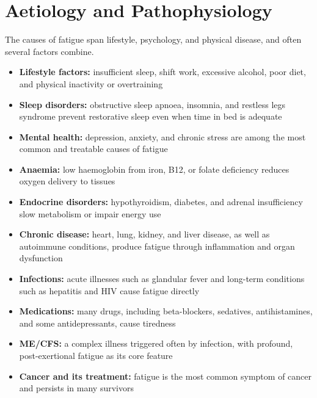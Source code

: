 \section*{Aetiology and Pathophysiology}
The causes of fatigue span lifestyle, psychology, and physical disease, and often several factors combine.
\begin{itemize}
    \item \textbf{Lifestyle factors:} insufficient sleep, shift work, excessive alcohol, poor diet, and physical inactivity or overtraining
    \item \textbf{Sleep disorders:} obstructive sleep apnoea, insomnia, and restless legs syndrome prevent restorative sleep even when time in bed is adequate
    \item \textbf{Mental health:} depression, anxiety, and chronic stress are among the most common and treatable causes of fatigue
    \item \textbf{Anaemia:} low haemoglobin from iron, B12, or folate deficiency reduces oxygen delivery to tissues
    \item \textbf{Endocrine disorders:} hypothyroidism, diabetes, and adrenal insufficiency slow metabolism or impair energy use
    \item \textbf{Chronic disease:} heart, lung, kidney, and liver disease, as well as autoimmune conditions, produce fatigue through inflammation and organ dysfunction
    \item \textbf{Infections:} acute illnesses such as glandular fever and long-term conditions such as hepatitis and HIV cause fatigue directly
    \item \textbf{Medications:} many drugs, including beta-blockers, sedatives, antihistamines, and some antidepressants, cause tiredness
    \item \textbf{ME/CFS:} a complex illness triggered often by infection, with profound, post-exertional fatigue as its core feature
    \item \textbf{Cancer and its treatment:} fatigue is the most common symptom of cancer and persists in many survivors
\end{itemize}

